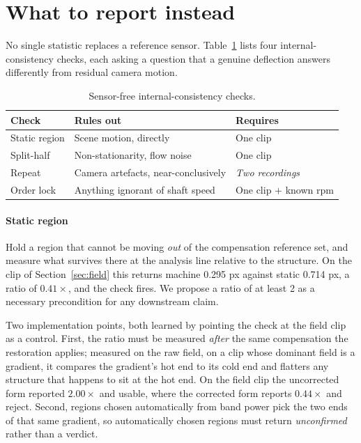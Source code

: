\documentclass[preprint,12pt]{elsarticle}
\begin{document}
\section{What to report instead}
\label{sec:checks}

No single statistic replaces a reference sensor. Table~\ref{tab:checks}
lists four internal-consistency checks, each asking a question that a
genuine deflection answers differently from residual camera motion.

\begin{table}[htbp]
\centering
\caption{Sensor-free internal-consistency checks.}
\label{tab:checks}
\begin{tabular}{lll}
\toprule
Check & Rules out & Requires\\
\midrule
Static region & Scene motion, directly & One clip\\
Split-half    & Non-stationarity, flow noise & One clip\\
Repeat        & Camera artefacts, near-conclusively
              & \emph{Two recordings}\\
Order lock    & Anything ignorant of shaft speed
              & One clip $+$ known rpm\\
\bottomrule
\end{tabular}
\end{table}

\paragraph{Static region}
Hold a region that cannot be moving \emph{out} of the compensation reference
set, and measure what survives there at the analysis line relative to the
structure. On the clip of Section~\ref{sec:field} this returns machine
0.295 px against static 0.714 px, a ratio of $0.41\times$, and the check
fires. We propose a ratio of at least 2 as a necessary precondition for any
downstream claim.

Two implementation points, both learned by pointing the check at the field
clip as a control. First, the ratio must be measured \emph{after} the same
compensation the restoration applies; measured on the raw field, on a clip
whose dominant field is a gradient, it compares the gradient's hot end to
its cold end and flatters any structure that happens to sit at the hot end.
On the field clip the uncorrected form reported $2.00\times$ and usable,
where the corrected form reports $0.44\times$ and reject. Second, regions
chosen automatically from band power pick the two ends of that same
gradient, so automatically chosen regions must return \emph{unconfirmed}
rather than a verdict.
\end{document}
